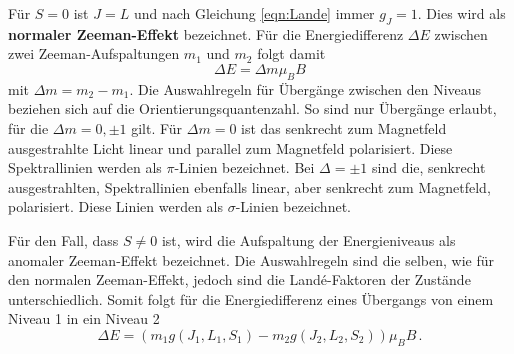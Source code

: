 Für $S=0$ ist $J=L$ und nach Gleichung \ref{eqn:Lande} immer $g_J = 1$.
Dies wird als \textbf{normaler Zeeman-Effekt} bezeichnet.
Für die Energiedifferenz $\Delta E$ zwischen zwei Zeeman-Aufspaltungen $m_1$ und $m_2$ folgt damit
\begin{equation*}
  \Delta E = \Delta m \mu_B B
\end{equation*}
mit $\Delta m  = m_2 - m_1$.
Die Auswahlregeln für Übergänge zwischen den Niveaus beziehen sich auf die Orientierungsquantenzahl.
So sind nur Übergänge erlaubt, für die $\Delta m = 0, \pm 1$ gilt.
Für $\Delta m = 0$ ist das senkrecht zum Magnetfeld ausgestrahlte Licht linear und parallel zum Magnetfeld polarisiert.
Diese Spektrallinien werden als $\pi$-Linien bezeichnet.
Bei $\Delta = \pm1$ sind die, senkrecht ausgestrahlten, Spektrallinien ebenfalls linear, aber senkrecht zum Magnetfeld, polarisiert.
Diese Linien werden als $\sigma$-Linien bezeichnet.

\par\bigskip

Für den Fall, dass $S \neq 0$ ist, wird die Aufspaltung der Energieniveaus als anomaler Zeeman-Effekt bezeichnet.
Die Auswahlregeln sind die selben, wie für den normalen Zeeman-Effekt, jedoch sind die Landé-Faktoren der Zustände unterschiedlich.
Somit folgt für die Energiedifferenz eines Übergangs von einem Niveau 1 in ein Niveau 2
\begin{equation*}
  \Delta E = \left( m_1 g(J_1,L_1,S_1) - m_2 g(J_2,L_2,S_2) \right) \mu_B B \, .
\end{equation*}
